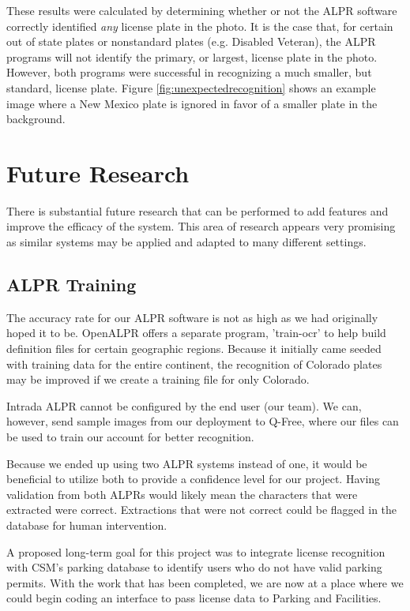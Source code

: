 \documentclass[11pt, oneside, fullpage, doublespace]{article}
\begin{document}
These results were calculated by determining whether or not the ALPR software correctly identified \emph{any} license plate in the photo. It is the case that, for certain out of state plates or nonstandard plates (e.g. Disabled Veteran), the ALPR programs will not identify the primary, or largest, license plate in the photo. However, both programs were successful in recognizing a much smaller, but standard, license plate. Figure \ref{fig:unexpectedrecognition} shows an example image where a New Mexico plate is ignored in favor of a smaller plate in the background.
\section{Future Research}
There is substantial future research that can be performed to add features and improve the efficacy of the system. This area of research appears very promising as similar systems may be applied and adapted to many different settings.

\subsection{ALPR Training}
The accuracy rate for our ALPR software is not as high as we had originally hoped it to be. OpenALPR offers a separate program, 'train-ocr' to help build definition files for certain geographic regions. Because it initially came seeded with training data for the entire continent, the recognition of Colorado plates may be improved if we create a training file for only Colorado.

Intrada ALPR cannot be configured by the end user (our team). We can, however, send sample images from our deployment to Q-Free, where our files can be used to train our account for better recognition.

Because we ended up using two ALPR systems instead of one, it would be beneficial to utilize both to provide a confidence level for our project. Having validation from both ALPRs would likely mean the characters that were extracted were correct. Extractions that were not correct could be flagged in the database for human intervention.

A proposed long-term goal for this project was to integrate license recognition with CSM's parking database to identify users who do not have valid parking permits. With the work that has been completed, we are now at a place where we could begin coding an interface to pass license data to Parking and Facilities.
\end{document}
